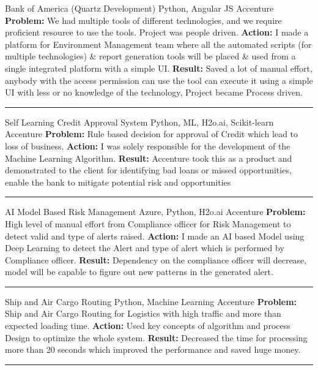 \begin{cventries}
	\cventry
	{}
	{Bank of America (Quartz Development)}
	{Python, Angular JS}
	{Accenture}
	{\textbf{Problem:} We had multiple tools of different technologies, and we require proficient resource to use the tools. Project was people driven.\newline
		\textbf{Action:} I made a platform for Environment Management team where all the automated scripts (for multiple technologies) \& report generation tools will be placed \& used from a single integrated platform with a simple UI.\newline
		\textbf{Result:} Saved a lot of manual effort, anybody with the access permission can use the tool can execute it using a simple UI with less or no knowledge of the technology, Project became Process driven.
	}
	\begin{center}
		\rule{30mm}{.1mm}
	\end{center}
	\cventry
	{}
	{Self Learning Credit Approval System}
	{Python, ML, H2o.ai, Scikit-learn}
	{Accenture}
	{\textbf{Problem:} Rule based decision for approval of Credit which lead to loss of business.\newline
		\textbf{Action:} I was solely responsible for the development of the Machine Learning Algorithm.\newline
		\textbf{Result:} Accenture took this as a product and demonstrated to the client for identifying bad loans or missed opportunities, enable the bank to mitigate potential risk and opportunities
	}
	\begin{center}
		\rule{30mm}{.1mm}
	\end{center}
	\cventry
	{
	}
	{AI Model Based Risk Management}
	{Azure, Python, H2o.ai}
	{Accenture}
	{\textbf{Problem:} High level of manual effort from Compliance officer for Risk Management to detect valid and type of alerts raised.\newline
		\textbf{Action:} I made an AI based Model using Deep Learning to detect the Alert and type of alert which is performed by Compliance officer.\newline
		\textbf{Result:} Dependency on the compliance officer will decrease, model will be capable to figure out new patterns in the generated alert.
	}
	\begin{center}
		\rule{30mm}{.1mm}
	\end{center}

	\cventry
	{}
	{Ship and Air Cargo Routing}
	{Python, Machine Learning}
	{Accenture}
	{\textbf{Problem:} Ship and Air Cargo Routing for Logistics with high traffic and more than expected loading time.\newline
		\textbf{Action:} Used key concepts of algorithm and process Design to optimize the whole system.\newline
		\textbf{Result:} Decreased the time for processing more than 20 seconds which improved the performance and saved huge money.}
	\begin{center}
		\rule{30mm}{.1mm}
	\end{center}


\end{cventries}
